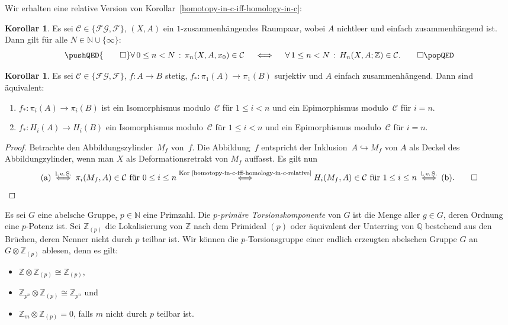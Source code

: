 \documentclass[11pt, a4paper, german]{article}
\theoremstyle{definition}
\newtheorem{kor}[lem]{Korollar}
\theoremstyle{remark}
\newcommand{\N}{\mathbb{N}} %
\newcommand{\Z}{\mathbb{Z}} %
\newcommand{\Q}{\mathbb{Q}} %
\newcommand{\fa}[1]{\forall \, {#1} \,:\,}
\newcommand{\SC}{\mathcal{C}} %
\newcommand{\FG}{\mathcal{FG}} %
\newcommand{\F}{\mathcal{F}} %
\begin{document}
Wir erhalten eine relative Version von Korollar~\ref{homotopy-in-c-iff-homology-in-c}:

\begin{kor}\label{homotopy-in-c-iff-homology-in-c-relative}
  Es sei $\SC \in \{ \FG, \F \}$, $(X, A)$ ein $1$-zusammenhängendes Raumpaar, wobei $A$ nichtleer und einfach zusammenhängend ist.
  Dann gilt für alle $N \in \N \cup \{ \infty \}$:
  \[
    \pushQED{\qed} 
    \fa{0 \leq n < N} \pi_n(X, A, x_0) \in \SC
    \quad \iff \quad
    \fa{1 \leq n < N} H_n(X, A; \Z) \in \SC.
    \qedhere
    \popQED
  \]
\end{kor}

\begin{kor}\label{homotopy-homology-equivalence-mod-c}
  Es sei $\SC \in \{ \FG, \F \}$, $f : A \to B$ stetig, $f_* : \pi_1(A) \to \pi_1(B)$ surjektiv und $A$ einfach zusammenhängend.
  Dann sind äquivalent:
  \begin{enumerate}[label=(\alph*)]
    \item $f_* : \pi_i(A) \to \pi_i(B)$ ist ein Isomorphismus modulo~$\SC$ für $1 \leq i < n$ und ein Epimorphismus modulo~$\SC$ für $i = n$.
    \item $f_* : H_i(A) \to H_i(B)$ ein Isomorphismus modulo~$\SC$ für $1 \leq i < n$ und ein Epimorphismus modulo~$\SC$ für $i = n$.
  \end{enumerate}
\end{kor}

\begin{proof}
  Betrachte den Abbildungszylinder~$M_f$ von~$f$.
  Die Abbildung~$f$ entspricht der Inklusion~$A \hookrightarrow M_f$ von $A$ als Deckel des Abbildungzylinder, wenn man $X$ als Deformationsretrakt von $M_f$ auffasst.
  Es gilt nun
  \[
    \text{(a)}
    \stackrel{\text{l.\,e.\,S.}}{\iff}
    \pi_i(M_f, A) \in \SC \text{ für } 0 \leq i \leq n
    \stackrel{\text{Kor \ref{homotopy-in-c-iff-homology-in-c-relative}}}{\iff}
    H_i(M_f, A) \in \SC \text{ für } 1 \leq i \leq n
    \stackrel{\text{l.\,e.\,S.}}{\iff}
    \text{(b)}.
    \qedhere
  \]
\end{proof}

Es sei $G$ eine abelsche Gruppe, $p \in \N$ eine Primzahl.
Die \emph{$p$-primäre Torsionskomponente} von $G$ ist die Menge aller $g \in G$, deren Ordnung eine $p$-Potenz ist.
Sei $\Z_{(p)}$ die Lokalisierung von $\Z$ nach dem Primideal $(p)$ oder äquivalent der Unterring von $\Q$ bestehend aus den Brüchen, deren Nenner nicht durch $p$ teilbar ist.
Wir können die $p$-Torsionsgruppe einer endlich erzeugten abelschen Gruppe $G$ an $G \otimes \Z_{(p)}$ ablesen, denn es gilt:
\begin{itemize}
  \item $\Z \otimes \Z_{(p)} \cong \Z_{(p)}$,
  \item $\Z_{p^n} \otimes \Z_{(p)} \cong \Z_{p^n}$ und
  \item $\Z_m \otimes \Z_{(p)} = 0$, falls $m$ nicht durch $p$ teilbar ist.
\end{itemize}
\end{document}
